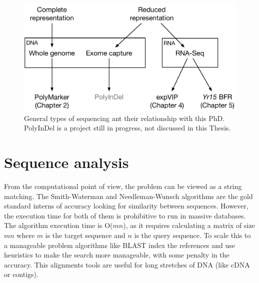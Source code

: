 \begin{figure}
\includegraphics[width=1\textwidth]{LitReview/Figures/typesOfSequencing.pdf}
\caption{General types of sequencing ant their relationship with this PhD. PolyInDel is a project still in progress, not discussed in this Thesis. }
\label{fig:lit:reducedRepresentation}
\end{figure}


\section{Sequence analysis}


From the computational point of view, the problem can be viewed as a string matching. The Smith-Waterman \cite{Smith1981} and Needleman-Wunsch\cite{Needleman1970} algorithms are the gold standard interns of accuracy looking for similarity between sequences. However, the execution time for both of them is prohibitive to run in massive databases. The algorithm execution time is O($mn$), as it requires calculating a matrix of size $mn$ where $m$ is the target sequence and $n$ is the query sequence.  To scale this to a manageable problem algorithms like BLAST index the references and use heuristics to make the search more manageable, with some penalty in the accuracy. This alignments tools are useful for long stretches of DNA (like cDNA or contigs)\cite{Altschul1990}.

